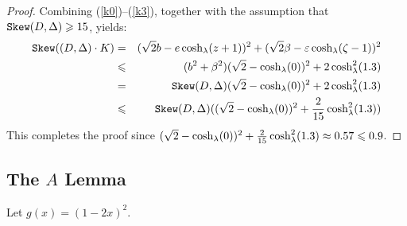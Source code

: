 \begin{proof}
\noindent
Combining (\ref{k0})--(\ref{k3}), together 
with the assumption that $\sk\state\geq\formula{\P}$, yields:
\begin{eqnarray}
\sk(\state \cdot K) & = & 
(\sqrt{2}b -e\cosl(z+1))^2 
+(\sqrt{2}\beta-\varepsilon\cosl(\zeta-1))^2 \nonumber\\
& \leq & 
(b^2+\beta^2)\pgfmathparse{
  ifthenelse((\kone{-\rr}) <= (\kone{0}) && (\kone{-\aa}) <= (\kone{0}), 0,
  ifthenelse ((\kone {-\rr}) <= (\kone {-\aa}), -\aa, -\rr)
}
(\sqrt{2} -\cosl(\pgfmathresult))^2
+
2\pgfmathparse{
  ifthenelse((\coshl {-\rr}) <= (\coshl {-\aa}), -\aa, -\rr)
}
\cosl^2(\pgfmathresult) \nonumber\\
& = & 
\sk\state\pgfmathparse{
  ifthenelse((\kone{-\rr}) <= (\kone{0}) && (\kone{-\aa}) <= (\kone{0}), 0,
  ifthenelse ((\kone {-\rr}) <= (\kone {-\aa}), -\aa, -\rr)
}
(\sqrt{2} -\cosl(\pgfmathresult))^2
+
2\pgfmathparse{
  ifthenelse((\coshl {-\rr}) <= (\coshl {-\aa}), -\aa, -\rr)
}
\cosl^2(\pgfmathresult) \nonumber\\
& \leq & 
\sk\state(\pgfmathparse{
  ifthenelse((\kone{-\rr}) <= (\kone{0}) && (\kone{-\aa}) <= (\kone{0}), 0,
  ifthenelse ((\kone {-\rr}) <= (\kone {-\aa}), -\aa, -\rr)
}
(\sqrt{2} -\cosl(\pgfmathresult))^2
+
\frac{2}{\formula{\P}}\pgfmathparse{
  ifthenelse((\coshl {-\rr}) <= (\coshl {-\aa}), -\aa, -\rr)
}
\cosl^2(\pgfmathresult)) \nonumber
\end{eqnarray}
This completes the proof since 
$\pgfmathparse{
  ifthenelse((\kone{-\rr}) <= (\kone{0}) && (\kone{-\aa}) <= (\kone{0}), 0,
  ifthenelse ((\kone {-\rr}) <= (\kone {-\aa}), -\aa, -\rr)
}
(\sqrt{2} -\cosl(\pgfmathresult))^2
+
\frac{2}{\formula{\P}}\pgfmathparse{
  ifthenelse((\coshl {-\rr}) <= (\coshl {-\aa}), -\aa, -\rr)
}
\cosl^2(\pgfmathresult)
\approx\formula{max((\kone {-\rr}),(\kone {-\aa}),(\kone{0})) +
(max((\coshl {-\rr})^2, (\coshl {-\aa})^2))*(2/\P)}
\leq \formula{\Qstep}$.
%
%
\end{proof}

\subsection[The A Lemma]{The $A$ Lemma}
\label{ssect-A}

\begin{definition}
  Let $g(x) = (1-2x)^2$. 
\end{definition}

